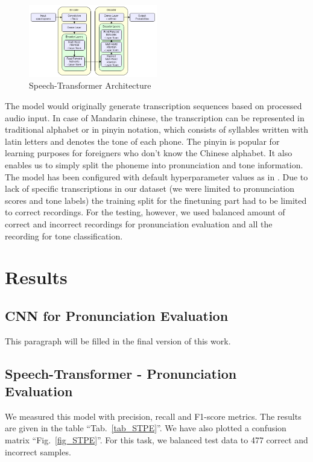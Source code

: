 \documentclass[conference]{IEEEtran}
\begin{document}
\begin{figure}[hbtp]
    \centerline{\includegraphics[width=0.5\textwidth]{Figures/Speech-Transformer.png}}
    \caption{Speech-Transformer Architecture}
    \label{fig_STArch} %
    \end{figure}

The model would originally generate transcription sequences based on processed audio input. In case of Mandarin chinese, the transcription can be represented in traditional alphabet or in pinyin notation, which consists of syllables written with latin letters and denotes the tone of each phone.
The pinyin is popular for learning purposes for foreigners who don't know the Chinese alphabet. It also enables us to simply split the phoneme into pronunciation and tone information.
The model has been configured with default hyperparameter values as in \cite{8462506}. Due to lack of specific transcriptions in our dataset (we were limited to pronunciation scores and tone labels) the training split for the finetuning part had to be limited to correct recordings. %
For the testing, however, we used balanced amount of correct and incorrect recordings for pronunciation evaluation and all the recording for tone classification.

\section{Results}

\subsection{CNN for Pronunciation Evaluation}
This paragraph will be filled in the final version of this work.

\subsection{Speech-Transformer - Pronunciation Evaluation}
We measured this model with precision, recall and F1-score metrics. The results are given in the table ``Tab.~\ref{tab_STPE}''. We have also plotted a confusion matrix ``Fig.~\ref{fig_STPE}''.
For this task, we balanced test data to 477 correct and incorrect samples.
\end{document}
